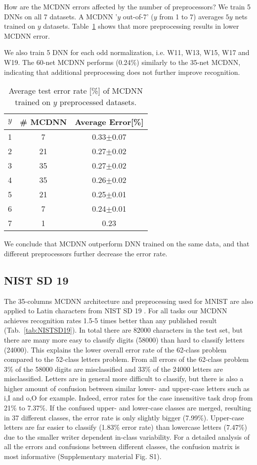 \documentclass[a4paper]{article}
\begin{document}
How are the MCDNN errors affected by the number of preprocessors? We train 5 DNNs on all 7 datasets. A MCDNN '$y$ out-of-7' ($y$ from 1 to 7) averages $5y$ nets trained on $y$ datasets. Table~\ref{tab:MNISTpreprocessings} shows that more preprocessing results in lower MCDNN error.

We also train 5 DNN for each odd normalization, i.e. W11, W13, W15, W17 and W19. The 60-net MCDNN performs (0.24\%) similarly to the 35-net MCDNN, indicating that additional preprocessing does not further improve recognition.

\begin{table}[h!]
	\caption{Average test error rate [\%] of MCDNN trained on $y$ preprocessed datasets.}
	\small
	\centering
  \begin{tabular}{cc|c}
	$y$	& 	\# MCDNN		&	Average Error[\%]\\
	\hline
	1	&	7			&	0.33$\pm$0.07\\
	2	&	21			&	0.27$\pm$0.02\\
	3	&	35			&	0.27$\pm$0.02\\
	4	&	35			&	0.26$\pm$0.02\\
	5	&	21			&	0.25$\pm$0.01\\
	6	&	7			&	0.24$\pm$0.01\\
	7	&	1			&	0.23\\
  \end{tabular}
  	\label{tab:MNISTpreprocessings}
\end{table}


We conclude that MCDNN outperform DNN trained on the same data, and that different preprocessors further decrease the error rate.

\subsection{NIST SD 19}

The 35-columns MCDNN architecture and preprocessing used for MNIST are also applied to Latin characters from NIST SD 19 \cite{NIST}. For all tasks our MCDNN achieves recognition rates 1.5-5 times better than any published result (Tab.~\ref{tab:NISTSD19}). In total there are 82000 characters in the test set, but there are many more easy to classify digits (58000) than hard to classify letters (24000). This explains the lower overall error rate of the 62-class problem compared to the 52-class letters problem. From all errors of the 62-class problem 3\% of the 58000 digits are misclassified and 33\% of the 24000 letters are misclassified. Letters are in general more difficult to classify, but there is also a higher amount of confusion between similar lower- and upper-case letters such as i,I and o,O for example. Indeed, error rates for the case insensitive task drop from 21\% to 7.37\%. If the confused upper- and lower-case classes are merged, resulting in 37 different classes, the error rate is only slightly bigger (7.99\%). Upper-case letters are far easier to classify (1.83\% error rate) than lowercase letters (7.47\%) due to the smaller writer dependent in-class variability. For a detailed analysis of all the errors and confusions between different classes, the confusion matrix is most informative (Supplementary material Fig. S1).
\end{document}
